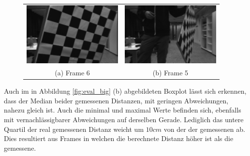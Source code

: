 	\begin{figure}[h]
		\centering
		\begin{tabular}{cc}
		\includegraphics[width=5cm]{img/evaluation/big_5_left}&
		\includegraphics[width=5cm]{img/evaluation/big_6_left}\\
		(a) Frame 6 &  (b) Frame 5
		\end{tabular}
		\caption{}
	    \label{fig:eval_big_fails}
	\end{figure}

	\noindent
	Auch im in Abbildung \ref{fig:eval_big} (b) abgebildeten Boxplot lässt sich erkennen, dass der Median beider gemessenen Distanzen, mit geringen Abweichungen, nahezu gleich ist. Auch die minimal und maximal Werte befinden sich, ebenfalls mit vernachlässigbarer Abweichungen auf derselben Gerade. Lediglich das untere Quartil der real gemessenen Distanz weicht um $10 cm$ von der der gemessenen ab. Dies resultiert aus Frames in welchen die berechnete Distanz höher ist als die gemessene.\\

